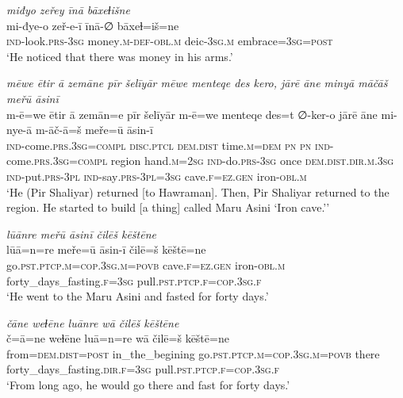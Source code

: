 \ea \label{ŽP.114}
\textit{miđyo zeřey īnā bāxeɫišne} \\ 
\gll mi-đye-o zeř-e-ī īnā-∅ bāxeɫ=iš=ne \\ 
 \textsc{ind-}look\textsc{.prs}\textsc{-3sg} money\textsc{.m}\textsc{-def}\textsc{-obl}\textsc{.m} deic\textsc{-3sg}\textsc{.m} embrace\textsc{=3sg}\textsc{=\textsc{post}} \\ 
\glt `He noticed that there was money in his arms.'
\z 
 
\ea \label{ŽP.116}
\textit{mēwe ētir ā zemāne pīr šelīyār mēwe menteqe des kero, jārē āne minyā māčāš meřū āsinī} \\ 
\gll m-ē=we ētir ā zemān=e pīr šelīyār m-ē=we menteqe des=t ∅-ker-o jārē āne mi-nye-ā m-āč-ā=š meře=ū āsin-ī \\ 
 \textsc{ind-}come\textsc{.prs}\textsc{.3sg}\textsc{=compl} \textsc{disc.ptcl} \textsc{dem.dist} time\textsc{.m}\textsc{=dem} \textsc{pn} \textsc{pn} \textsc{ind-}come\textsc{.prs}\textsc{.3sg}\textsc{=compl} region hand\textsc{.m}\textsc{=\textsc{2sg}} \textsc{ind-}do\textsc{.prs}\textsc{-3sg} once \textsc{dem.dist}\textsc{.dir}\textsc{.m}\textsc{.3sg} \textsc{ind-}put\textsc{.prs}\textsc{-3pl} \textsc{ind-}say\textsc{.prs}\textsc{-3pl}\textsc{=3sg} cave\textsc{.f}\textsc{\textsc{=ez.gen}} iron\textsc{-obl}\textsc{.m} \\ 
\glt `He (Pir Shaliyar) returned [to Hawraman]. Then, Pir Shaliyar returned to the region. He started to build [a thing] called Maru Asini ‘Iron cave.’'
\z 
 
\ea \label{ŽP.118}
\textit{lūānre meřū āsinī čilēš kēštēne} \\ 
\gll lūā=n=re meře=ū āsin-ī čilē=š kēštē=ne \\ 
 go\textsc{.pst}\textsc{.ptcp}\textsc{.m}\textsc{=cop}\textsc{.3sg}\textsc{.m}\textsc{=\textsc{povb}} cave\textsc{.f}\textsc{\textsc{=ez.gen}} iron\textsc{-obl}\textsc{.m} forty\_days\_fasting\textsc{.f}\textsc{=3sg} pull\textsc{.pst}\textsc{.ptcp}\textsc{.f}\textsc{=cop}\textsc{.3sg}\textsc{.f} \\ 
\glt `He went to the Maru Asini and fasted for forty days.'
\z 
 
\ea \label{ŽP.119}
\textit{čāne weɫēne luānre wā čilēš kēštēne} \\ 
\gll č=ā=ne weɫēne luā=n=re wā čilē=š kēštē=ne \\ 
 from=\textsc{dem.dist}\textsc{=\textsc{post}} in\_the\_begining go\textsc{.pst}\textsc{.ptcp}\textsc{.m}\textsc{=cop}\textsc{.3sg}\textsc{.m}\textsc{=\textsc{povb}} there forty\_days\_fasting\textsc{.dir}\textsc{.f}\textsc{=3sg} pull\textsc{.pst}\textsc{.ptcp}\textsc{.f}\textsc{=cop}\textsc{.3sg}\textsc{.f} \\ 
\glt `From long ago, he would go there and fast for forty days.'
\z 
 
